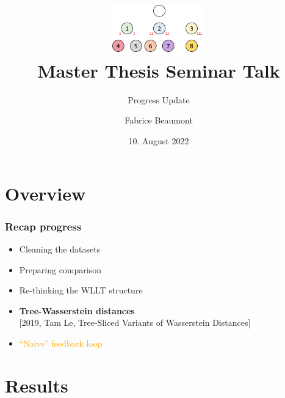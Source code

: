 

\title[MA Seminar Talk - Progress]{
	\centering
	\includegraphics[width=0.3\textwidth]{images/WLLT}\\
	Master Thesis Seminar Talk	
}
\subtitle{Progress Update}
\author[F. Beaumont]{Fabrice Beaumont}
\date{10. August 2022}

\newcommand{\figureWidth}{7cm}
\newcommand{\figureHorizontal}{2cm}
\newcommand{\figureVertical}{5cm}



\begin{frame}
	\titlepage
\end{frame}

\section{Overview}

\begin{frame}
\frametitle{Recap progress} \vspace{-1cm}
	\begin{itemize}
		\item Cleaning the datasets
		\item Preparing comparison
		\item Re-thinking the WLLT structure
		\item \textbf{Tree-Wasserstein distances}\\
		{\tiny [2019, Tam Le, Tree-Sliced Variants of Wasserstein Distances]}
		\item \textcolor{orange}{\enquote{Naive} feedback loop}
	\end{itemize}
\end{frame}

\section{Results}

